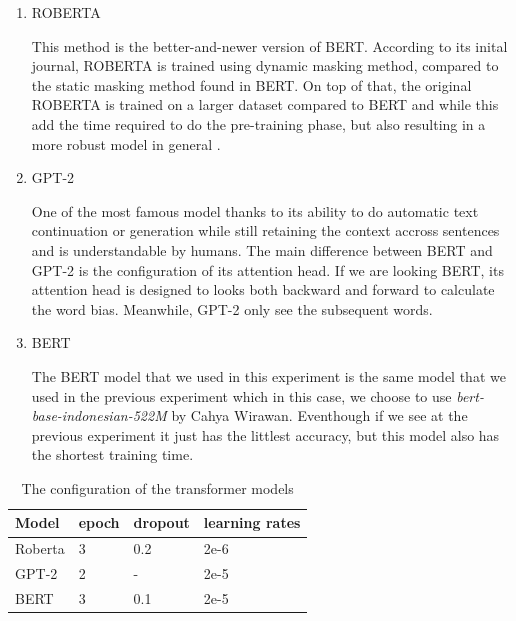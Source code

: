 \begin{enumerate}
  \item ROBERTA

        This method is the better-and-newer version of BERT. According to its inital journal, ROBERTA is trained using dynamic masking method, compared to the static masking method found in BERT. On top of that, the original ROBERTA is trained on a larger dataset compared to BERT and while this add the time required to do the pre-training phase, but also resulting in a more robust model in general \cite{roberta}.

  \item GPT-2

        One of the most famous model thanks to its ability to do automatic text continuation or generation while still retaining the context accross sentences and is understandable by humans. The main difference between BERT and GPT-2 is the configuration of its attention head. If we are looking BERT, its attention head is designed to looks both backward and forward to calculate the word bias. Meanwhile, GPT-2 only see the subsequent words.

  \item BERT

        The BERT model that we used in this experiment is the same model that we used in the previous experiment which in this case, we choose to use \textit{bert-base-indonesian-522M} by Cahya Wirawan. Eventhough if we see at the previous experiment it just has the littlest accuracy, but this model also has the shortest training time.

\end{enumerate}

\begin{table}[h]
  \centering
  \caption{The configuration of the transformer models}
  \label{tab: transformer_config}
  \begin{tabular}{|l|l|l|l|}
    \hline
    \textbf{Model} & \textbf{epoch} & \textbf{dropout} & \textbf{learning rates} \\ \hline
    Roberta        & 3              & 0.2              & 2e-6                    \\ \hline
    GPT-2          & 2              & -                & 2e-5                    \\ \hline
    BERT           & 3              & 0.1              & 2e-5                    \\ \hline
  \end{tabular}
\end{table}


